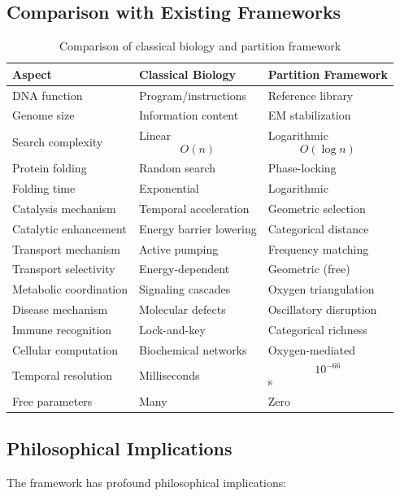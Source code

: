 \documentclass[12pt,a4paper]{article}
\begin{document}
\subsection{Comparison with Existing Frameworks}

\begin{table}[h]
\centering
\begin{tabular}{|l|l|l|}
\hline
\textbf{Aspect} & \textbf{Classical Biology} & \textbf{Partition Framework} \\
\hline
DNA function & Program/instructions & Reference library \\
Genome size & Information content & EM stabilization \\
Search complexity & Linear $$O(n)$$ & Logarithmic $$O(\log n)$$ \\
Protein folding & Random search & Phase-locking \\
Folding time & Exponential & Logarithmic \\
Catalysis mechanism & Temporal acceleration & Geometric selection \\
Catalytic enhancement & Energy barrier lowering & Categorical distance \\
Transport mechanism & Active pumping & Frequency matching \\
Transport selectivity & Energy-dependent & Geometric (free) \\
Metabolic coordination & Signaling cascades & Oxygen triangulation \\
Disease mechanism & Molecular defects & Oscillatory disruption \\
Immune recognition & Lock-and-key & Categorical richness \\
Cellular computation & Biochemical networks & Oxygen-mediated \\
Temporal resolution & Milliseconds & $$10^{-66}$$ s \\
Free parameters & Many & Zero \\
\hline
\end{tabular}
\caption{Comparison of classical biology and partition framework}
\end{table}

\subsection{Philosophical Implications}

The framework has profound philosophical implications:
\end{document}

